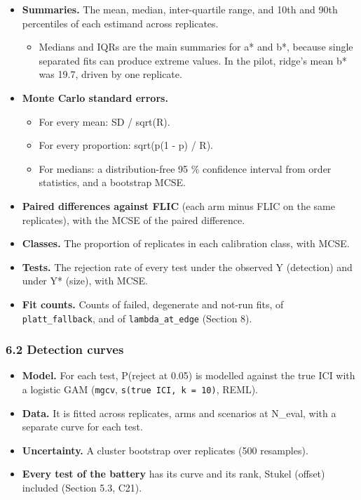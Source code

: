 \documentclass[
  10pt,
]{article}
\providecommand{\tightlist}{%
  \setlength{\itemsep}{0pt}\setlength{\parskip}{0pt}}
\begin{document}
\begin{itemize}
\tightlist
\item
  \textbf{Summaries.} The mean, median, inter-quartile
  range, and 10th and 90th percentiles of each estimand
  across replicates.

  \begin{itemize}
  \tightlist
  \item
    Medians and IQRs are the main summaries for a* and b*,
    because single separated fits can produce extreme
    values. In the pilot, ridge's mean b* was 19.7, driven
    by one replicate.
  \end{itemize}
\item
  \textbf{Monte Carlo standard errors.}

  \begin{itemize}
  \tightlist
  \item
    For every mean: SD / sqrt(R).
  \item
    For every proportion: sqrt(p(1 - p) / R).
  \item
    For medians: a distribution-free 95 \% confidence
    interval from order statistics, and a bootstrap MCSE.
  \end{itemize}
\item
  \textbf{Paired differences against FLIC} (each arm minus
  FLIC on the same replicates), with the MCSE of the paired
  difference.
\item
  \textbf{Classes.} The proportion of replicates in each
  calibration class, with MCSE.
\item
  \textbf{Tests.} The rejection rate of every test under the
  observed Y (detection) and under Y* (size), with MCSE.
\item
  \textbf{Fit counts.} Counts of failed, degenerate and
  not-run fits, of \texttt{platt\_fallback}, and of
  \texttt{lambda\_at\_edge} (Section 8).
\end{itemize}

\subsubsection{6.2 Detection curves}\label{detection-curves}

\begin{itemize}
\tightlist
\item
  \textbf{Model.} For each test, P(reject at 0.05) is
  modelled against the true ICI with a logistic GAM
  (\texttt{mgcv}, \texttt{s(true\ ICI,\ k\ =\ 10)}, REML).
\item
  \textbf{Data.} It is fitted across replicates, arms and
  scenarios at N\_eval, with a separate curve for each test.
\item
  \textbf{Uncertainty.} A cluster bootstrap over replicates
  (500 resamples).
\item
  \textbf{Every test of the battery} has its curve and its
  rank, Stukel (offset) included (Section 5.3, C21).
\end{itemize}
\end{document}
